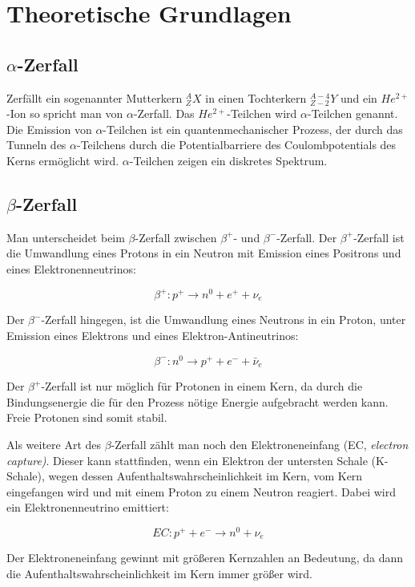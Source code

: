 \section{Theoretische Grundlagen}


\subsection{$\alpha$-Zerfall}

Zerfällt ein sogenannter Mutterkern $_Z^AX$ in einen Tochterkern $_{Z-2}^{A-4}Y$ und ein $He^{2+}$-Ion so spricht man von $\alpha$-Zerfall. Das $He^{2+}$-Teilchen wird $\alpha$-Teilchen genannt. Die Emission von $\alpha$-Teilchen ist ein quantenmechanischer Prozess, der durch das Tunneln des $\alpha$-Teilchens durch die Potentialbarriere des Coulombpotentials des Kerns ermöglicht wird. $\alpha$-Teilchen zeigen ein diskretes Spektrum.

\subsection{$\beta$-Zerfall}

Man unterscheidet beim $\beta$-Zerfall zwischen $\beta^+$- und $\beta^-$-Zerfall. Der $\beta^+$-Zerfall ist die Umwandlung eines Protons in ein Neutron mit Emission eines Positrons und eines Elektronenneutrinos:

$$ \beta^+: p^+ \rightarrow n^0 + e^+ + \nu_e $$

Der $\beta^-$-Zerfall hingegen, ist die Umwandlung eines Neutrons in ein Proton, unter Emission eines Elektrons und eines Elektron-Antineutrinos:

$$ \beta^-: n^0 \rightarrow p^+ + e^- + \bar \nu_e $$

Der $\beta^+$-Zerfall ist nur möglich für Protonen in einem Kern, da durch die Bindungsenergie die für den Prozess nötige Energie aufgebracht werden kann. Freie Protonen sind somit stabil.

Als weitere Art des $\beta$-Zerfall zählt man noch den Elektroneneinfang (EC, \emph{electron capture)}. Dieser kann stattfinden, wenn ein Elektron der untersten Schale (K-Schale), wegen dessen Aufenthaltswahrscheinlichkeit im Kern, vom Kern eingefangen wird und mit einem Proton zu einem Neutron reagiert. Dabei wird ein Elektronenneutrino emittiert:

$$ EC: p^+ + e^- \rightarrow n^0 + \nu_e $$

Der Elektroneneinfang gewinnt mit größeren Kernzahlen an Bedeutung, da dann die Aufenthaltswahrscheinlichkeit im Kern immer größer wird.

